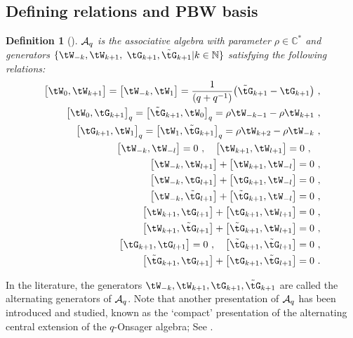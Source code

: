 \documentclass[11pt]{amsart}
\numberwithin{equation}{section}
\newtheorem{defn}[thm]{Definition}
\numberwithin{equation}{section}
\begin{document}
\begin{appendix}
\subsection{Defining relations and PBW basis}
	\begin{defn}[\cite{BSh1}] ${\cal A}_q$ \label{DefAq} is the associative algebra with parameter $\rho\in{\mathbb C}^*$ and generators $\{{\tW}_{-k},{\tW}_{k+1},$
		${\tG}_{k+1},{\tilde{\tG}}_{k+1}|k\in {\mathbb N}\}$ satisfying the following relations:
		\begin{align}
			\big[{\tW}_0,{\tW}_{k+1}\big]=\big[{\tW}_{-k},{\tW}_{1}\big]=\frac{1}{(q+q^{-1})}\big({\tilde{\tG}_{k+1} } - {{\tG}_{k+1}}\big)\ ,\label{qo1}\\
			\big[{\tW}_0,{\tG}_{k+1}\big]_q=\big[{\tilde{\tG}}_{k+1},{\tW}_{0}\big]_q=\rho{\tW}_{-k-1}-\rho{\tW}_{k+1}\ ,\label{qo2}\\
			\big[{\tG}_{k+1},{\tW}_{1}\big]_q=\big[{\tW}_{1},{\tilde{\tG}}_{k+1}\big]_q=\rho{\tW}_{k+2}-\rho{\tW}_{-k}\ ,\label{qo3}\\
			\big[{\tW}_{-k},{\tW}_{-l}\big]=0\ ,\quad 
			\big[{\tW}_{k+1},{\tW}_{l+1}\big]=0\ ,\label{qo4}\quad \\
			\big[{\tW}_{-k},{\tW}_{l+1}\big]
			+\big[{{\tW}}_{k+1},{\tW}_{-l}\big]=0\ ,\label{qo5}\\
			\big[{\tW}_{-k},{\tG}_{l+1}\big]
			+\big[{{\tG}}_{k+1},{\tW}_{-l}\big]=0\ ,\label{qo6}\\
			\big[{\tW}_{-k},{\tilde{\tG}}_{l+1}\big]
			+\big[{\tilde{\tG}}_{k+1},{\tW}_{-l}\big]=0\ ,\label{qo7}\\
			\big[{\tW}_{k+1},{\tG}_{l+1}\big]
			+\big[{{\tG}}_{k+1},{\tW}_{l+1}\big]=0\ ,\label{qo8}\\
			\big[{\tW}_{k+1},{\tilde{\tG}}_{l+1}\big]
			+\big[{\tilde{\tG}}_{k+1},{\tW}_{l+1}\big]=0\ ,\label{qo9}\\
			\big[{\tG}_{k+1},{\tG}_{l+1}\big]=0\ ,\quad   \big[{\tilde{\tG}}_{k+1},\tilde{{\tG}}_{l+1}\big]=0\ ,\label{qo10}\\
			\big[{\tilde{\tG}}_{k+1},{\tG}_{l+1}\big]
			+\big[{{\tG}}_{k+1},\tilde{{\tG}}_{l+1}\big]=0\ .\label{qo11}
		\end{align}
	\end{defn}
	In the literature, the generators ${\tW}_{-k},{\tW}_{k+1},{\tG}_{k+1},{\tilde{\tG}}_{k+1}$ are called the alternating generators of ${\cal A}_q$. Note that another presentation of ${\cal A}_q$ has been introduced and studied, known as the `compact' presentation of the alternating central extension of the $q$-Onsager algebra;  See \cite[Thm.\,1.1, Thm.\,1.2]{Ter21c}.

\end{appendix}
\end{document}
